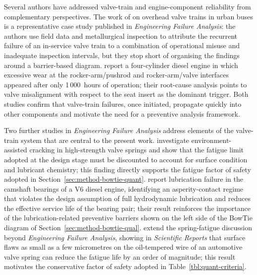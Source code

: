 Several authors have addressed valve-train and engine-component
reliability from complementary perspectives. The work of
\citet{velezgodino2019overheadvalvetrain} on overhead valve trains in
urban buses is a representative case study published in
\textit{Engineering Failure Analysis}: the authors use field data and
metallurgical inspection to attribute the recurrent failure of an
in-service valve train to a combination of operational misuse and
inadequate inspection intervals, but they stop short of organising the
findings around a barrier-based diagram. \citet{soffritti2018wornvalvetrain}
report a four-cylinder diesel engine in which excessive wear at the
rocker-arm/pushrod and rocker-arm/valve interfaces appeared after only
1\,000~hours of operation; their root-cause analysis points to valve
misalignment with respect to the seat insert as the dominant trigger.
Both studies confirm that valve-train failures, once initiated,
propagate quickly into other components and motivate the need for a
preventive analysis framework.

Two further studies in \textit{Engineering Failure Analysis} address
elements of the valve-train system that are central to the present
work. \citet{xing2021valvespringEAC} investigate environment-assisted
cracking in high-strength valve springs and show that the fatigue limit
adopted at the design stage must be discounted to account for surface
condition and lubricant chemistry; this finding directly supports the
fatigue factor of safety adopted in
Section~\ref{sec:method-bowtie-quant}.
\citet{zhao2023camshaftV6} report lubrication failure in the camshaft
bearings of a V6 diesel engine, identifying an asperity-contact regime
that violates the design assumption of full hydrodynamic lubrication
and reduces the effective service life of the bearing pair; their
result reinforces the importance of the lubrication-related preventive
barriers shown on the left side of the BowTie diagram of
Section~\ref{sec:method-bowtie-qual}.
\citet{ko2022springfatigueflaws} extend the spring-fatigue discussion
beyond \textit{Engineering Failure Analysis}, showing in
\textit{Scientific Reports} that surface flaws as small as a few
micrometres on the oil-tempered wire of an automotive valve spring can
reduce the fatigue life by an order of magnitude; this result motivates
the conservative factor of safety adopted in
Table~\ref{tbl:quant-criteria}.

